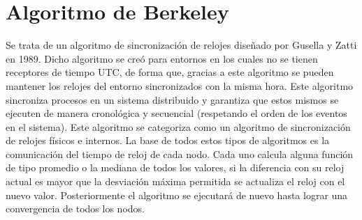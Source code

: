 \documentclass[a4paper,12pt]{report}
\begin{document}
\section{Algoritmo de Berkeley}
Se trata de un algoritmo de sincronización de relojes diseñado por Gusella y Zatti en 1989. Dicho algoritmo se creó para entornos en los cuales no se tienen receptores de tiempo UTC, de forma que, gracias a este algoritmo se pueden mantener los relojes del entorno sincronizados con la misma hora. Este algoritmo sincroniza procesos en un sistema distribuido y garantiza que estos mismos se ejecuten de manera cronológica y secuencial (respetando el orden de los eventos en el sistema). Este algoritmo se categoriza como un algoritmo de sincronización de relojes físicos e internos. La base de todos estos tipos de algoritmos es la comunicación del tiempo de reloj de cada nodo. Cada uno calcula alguna función de tipo promedio o la mediana de todos los valores, si la diferencia con su reloj actual es mayor que la desviación máxima permitida se actualiza el reloj con el nuevo valor. Posteriormente el algoritmo se ejecutará de nuevo hasta lograr una convergencia de todos los nodos. \cite{berkeley}
\end{document}
